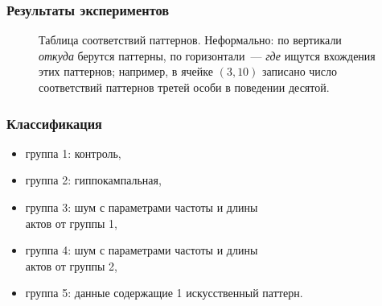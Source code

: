 \documentclass[smaller]{beamer}
\begin{document}
\begin{frame}
  \frametitle{Результаты экспериментов}
\begin{figure}[H]
\noindent{}
\caption{ Таблица соответствий паттернов. Неформально: 
по вертикали {\em откуда} берутся паттерны, по горизонтали~--- {\em где} ищутся вхождения этих паттернов; например, в ячейке $(3,10)$ записано
число соответствий паттернов третей особи в поведении десятой.}

\end{figure}
\end{frame}

\begin{frame}
  \frametitle{Классификация}
\begin{itemize}
 \item группа 1: контроль,
\item группа 2: гиппокампальная,
\item группа 3: шум с параметрами частоты и длины\\ актов от группы 1,
\item группа 4: шум с параметрами частоты и длины\\ актов от группы 2,
\item группа 5: данные содержащие 1 искусственный паттерн.
\end{itemize}
\end{frame}
\end{document}
